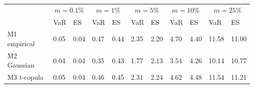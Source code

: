 \begin{tabular}{lllllllllll}
\toprule
 & \multicolumn{2}{c}{$m=0.1\%$} & \multicolumn{2}{c}{$m=1\%$} & \multicolumn{2}{c}{$m=5\%$} & \multicolumn{2}{c}{$m=10\%$} & \multicolumn{2}{c}{$m=25\%$} \\
 & VaR & ES & VaR & ES & VaR & ES & VaR & ES & VaR & ES \\
\midrule
M1 empirical & 0.05 & 0.04 & 0.47 & 0.44 & 2.35 & 2.20 & 4.70 & 4.40 & 11.58 & 11.00 \\
M2 Gaussian & 0.04 & 0.04 & 0.35 & 0.43 & 1.77 & 2.13 & 3.54 & 4.26 & 10.14 & 10.77 \\
M3 $t$-copula & 0.05 & 0.04 & 0.46 & 0.45 & 2.31 & 2.24 & 4.62 & 4.48 & 11.54 & 11.21 \\
\bottomrule
\end{tabular}
